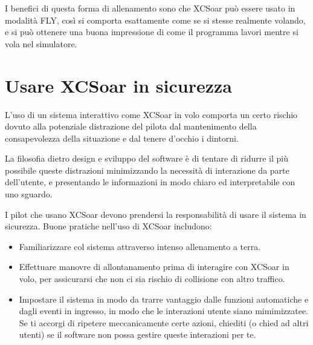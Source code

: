 I benefici di questa forma di allenamento sono che XCSoar può essere usato
in modalità FLY, così si comporta esattamente come se si stesse realmente
volando, e si può ottenere una buona impressione di come il programma lavori
mentre si vola nel simulatore.

\section{Usare XCSoar in sicurezza}\label{sec:usingxcsoarsafely}\label{conf:usingxcsoarsafely}
L'uso di un sistema interattivo come XCSoar in volo comporta un certo
rischio dovuto alla potenziale distrazione del pilota dal mantenimento
della consapevolezza della situazione e dal tenere d'occhio i dintorni.

La filosofia dietro design e sviluppo del software è di tentare di ridurre
il più possibile queste distrazioni minimizzando la necessità di interazione
da parte dell'utente, e presentando le informazioni in modo chiaro ed
interpretabile con uno sguardo.

I pilot che usano XCSoar devono prendersi la responsabilità di usare il
sistema in sicurezza.
Buone pratiche nell'uso di XCSoar includono:
\begin{itemize}
\item Familiarizzare col sistema attraverso intenso allenamento a terra.
\item Effettuare manovre di allontanamento prima di interagire con XCSoar
  in volo, per assicurarsi che non ci sia rischio di collisione con altro traffico.
\item Impostare il sistema in modo da trarre vantaggio dalle funzioni automatiche
  e dagli eventi in ingresso, in modo che le interazioni utente siano mimimizzatee.
  Se ti accorgi di ripetere meccanicamente certe azioni, chiediti (o chied ad altri
  utenti) se il software non possa gestire queste interazioni per te.
\end{itemize}

